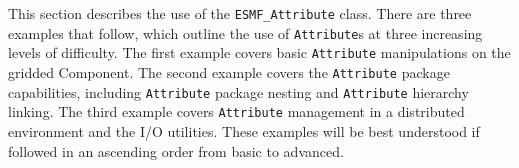 %


This section describes the use of the {\tt ESMF\_Attribute} class.  There are three examples that follow, which outline the use of {\tt Attribute}s at three increasing levels of difficulty.  The first example covers basic {\tt Attribute} manipulations on the gridded Component.  The second example covers the {\tt Attribute} package capabilities, including {\tt Attribute} package nesting and {\tt Attribute} hierarchy linking.  The third example covers {\tt Attribute} management in a distributed environment and the I/O utilities.  These examples will be best understood if followed in an ascending order from basic to advanced.